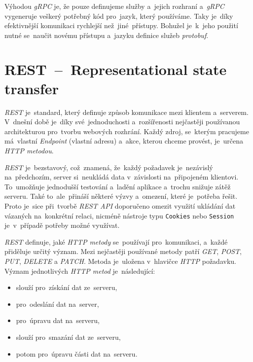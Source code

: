 \documentclass[11pt,a4paper]{report}
\newcommand{\harddata}[1]{\boxed{\texttt{#1}}}
\begin{document}
            Výhodou \emph{gRPC} je, že pouze definujeme služby a~jejich rozhraní a~\emph{gRPC} vygeneruje veškerý potřebný kód pro~jazyk, který používáme. Taky je~díky efektivnější komunikaci rychlejší než~jiné~přístupy. Bohužel je~k~jeho použití nutné se~naučit novému přístupu a~jazyku definice služeb \emph{protobuf}. \cite{thenewstackBuildRealWorld}

        \section{REST~--~Representational state transfer}
            \emph{REST} je~standard, který definuje způsob komunikace mezi klientem a~serverem. V~dnešní době je~díky své~jednoduchosti a~rozšířenosti nejčastěji používanou architekturou pro~tvorbu webových rozhrání. Každý zdroj, se~kterým pracujeme má~vlastní \emph{Endpoint} (vlastní adresu) a~akce, kterou chceme provést, je~určena \emph{HTTP metodou}.
            
            \emph{REST} je~bezstavový, což~znamená, že~každý požadavek je~nezávislý na~předchozím, server si~neukládá data v~závislosti na~připojeném klientovi. To~umožňuje jednodušší testování a~ladění aplikace a~trochu snižuje zátěž serveru. Také to~ale~přináší některé výzvy a~omezení, které je~potřeba řešit. Proto je~sice při~tvorbě \emph{REST API} doporučeno omezit využití ukládání dat vázaných na~konkrétní relaci, nicméně nástroje typu \texttt{Cookies} nebo \texttt{Session} je~v~případě potřeby možné využívat.
            
            \emph{REST} definuje, jaké \emph{HTTP metody} se~používají pro~komunikaci, a~každé přiděluje určitý význam. Mezi nejčastěji používané metody patří \emph{GET}, \emph{POST}, \emph{PUT}, \emph{DELETE} a \emph{PATCH}. Metoda je~uložena v~hlavičce \emph{HTTP} požadavku. Význam jednotlivých \emph{HTTP metod} je~následující:
            
            \begin{itemize}
                \item \harddata{GET} slouží pro~získání dat ze~serveru,
                \item \harddata{POST} pro~odeslání dat na~server,
                \item \harddata{PUT} pro~úpravu dat na~serveru,
                \item \harddata{DELETE} slouží pro~smazání dat ze~serveru,
                \item \harddata{PATCH} potom pro~úpravu části dat na~serveru.
            \end{itemize}
\end{document}
